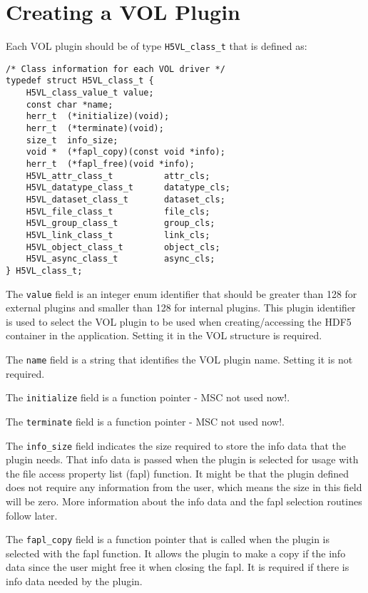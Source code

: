 \section{Creating a VOL Plugin}
\label{sec:vol}
Each VOL plugin should be of type {\tt H5VL\_class\_t} that is defined
as:

\begin{lstlisting}
/* Class information for each VOL driver */
typedef struct H5VL_class_t {
    H5VL_class_value_t value;
    const char *name;
    herr_t  (*initialize)(void);
    herr_t  (*terminate)(void);
    size_t  info_size;
    void *  (*fapl_copy)(const void *info);
    herr_t  (*fapl_free)(void *info);
    H5VL_attr_class_t          attr_cls;
    H5VL_datatype_class_t      datatype_cls;
    H5VL_dataset_class_t       dataset_cls;
    H5VL_file_class_t          file_cls;
    H5VL_group_class_t         group_cls;
    H5VL_link_class_t          link_cls;
    H5VL_object_class_t        object_cls;
    H5VL_async_class_t         async_cls;
} H5VL_class_t;
\end{lstlisting}

The {\tt value} field is an integer enum identifier that should be
greater than 128 for external plugins and smaller than 128 for
internal plugins. This plugin identifier is used to select the VOL
plugin to be used when creating/accessing the HDF5 container in the
application. Setting it in the VOL structure is required.

The {\tt name} field is a string that identifies the VOL plugin
name. Setting it is not required.

The {\tt initialize} field is a function pointer - MSC not used now!.

The {\tt terminate} field is a function pointer - MSC not used now!.

The {\tt info\_size} field indicates the size required to store the
info data that the plugin needs. That info data is passed when the
plugin is selected for usage with the file access property list (fapl)
function. It might be that the plugin defined does not require any
information from the user, which means the size in this field will be
zero. More information about the info data and the fapl selection
routines follow later.

The {\tt fapl\_copy} field is a function pointer that is called when
the plugin is selected with the fapl function. It allows the plugin to
make a copy if the info data since the user might free it when closing
the fapl. It is required if there is info data needed by the plugin.

